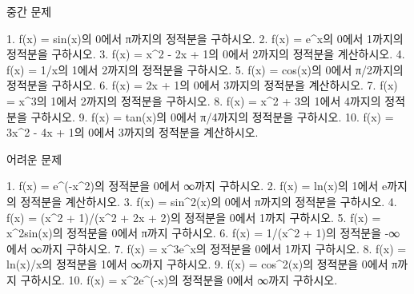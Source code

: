 \documentclass[fleqn]{article}
\begin{document}
 중간 문제

1. f(x) = sin(x)의 0에서 π까지의 정적분을 구하시오.  
2. f(x) = e^x의 0에서 1까지의 정적분을 구하시오.  
3. f(x) = x^2 - 2x + 1의 0에서 2까지의 정적분을 계산하시오.  
4. f(x) = 1/x의 1에서 2까지의 정적분을 구하시오.  
5. f(x) = cos(x)의 0에서 π/2까지의 정적분을 구하시오.  
6. f(x) = 2x + 1의 0에서 3까지의 정적분을 계산하시오.  
7. f(x) = x^3의 1에서 2까지의 정적분을 구하시오.  
8. f(x) = x^2 + 3의 1에서 4까지의 정적분을 구하시오.  
9. f(x) = tan(x)의 0에서 π/4까지의 정적분을 구하시오.  
10. f(x) = 3x^2 - 4x + 1의 0에서 3까지의 정적분을 계산하시오.  

 어려운 문제

1. f(x) = e^(-x^2)의 정적분을 0에서 ∞까지 구하시오.  
2. f(x) = ln(x)의 1에서 e까지의 정적분을 계산하시오.  
3. f(x) = sin^2(x)의 0에서 π까지의 정적분을 구하시오.  
4. f(x) = (x^2 + 1)/(x^2 + 2x + 2)의 정적분을 0에서 1까지 구하시오.  
5. f(x) = x^2sin(x)의 정적분을 0에서 π까지 구하시오.  
6. f(x) = 1/(x^2 + 1)의 정적분을 -∞에서 ∞까지 구하시오.  
7. f(x) = x^3e^x의 정적분을 0에서 1까지 구하시오.  
8. f(x) = ln(x)/x의 정적분을 1에서 ∞까지 구하시오.  
9. f(x) = cos^2(x)의 정적분을 0에서 π까지 구하시오.  
10. f(x) = x^2e^(-x)의 정적분을 0에서 ∞까지 구하시오.  

      
        
\end{document}
